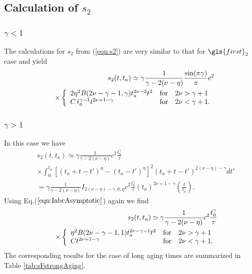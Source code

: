 \subsection{Calculation of $s_2$}

\subsubsection{$\gamma<1$}
The calculations for $s_2$ from (\ref{eqn:s2}) are very similar to that for $\gls{first}_{2}$ case and yield
\begin{eqnarray}
&& s_{2}(t,t_a) \simeq \gamma\frac{ 1}{\gamma-2(\nu-\eta)} \frac{\sin(\pi \gamma)}{\pi} c^2 \\
&& \; \times \left\{ \begin{array}{l l l}
2 \eta^2 B(2\nu -\gamma -1,\gamma)  t_a^{2\nu-2} t^2 & \mathrm{for}& 2\nu> \gamma+1\\
C \, t_a^{\gamma-1}t^{2\nu + 1-\gamma} & \mathrm{for} & 2\nu < \gamma+1.
\end{array} \right. \nonumber
\end{eqnarray}

\subsubsection{$\gamma>1$}
In this case we have 
\begin{eqnarray}
&& s_{2}(t,t_a) \simeq \gamma \frac{1}{\gamma-2(\nu-\eta)}c^2 \frac{t_0^{\gamma}}{\tau} \nonumber\\
&& \times \int^{t_a}_{0} \left[ (t_a+t-t')^{\eta}-(t_a-t')^{\eta} \right]^2 (t_a+t-t')^{2(\nu-\eta)-\gamma} dt' \nonumber \\
&&  =\gamma \frac{1}{\gamma-2(\nu-\eta)}I_{2(\nu-\eta)-\gamma,0,\eta} c^2 \frac{t_0^{\gamma}}{\tau} (t_a)^{2\nu+1- \gamma} \left(\frac{t}{t_a}\right) .
\end{eqnarray}
Using Eq.($\ref{eqn:IabcAsymptotic}$) again we find
\begin{eqnarray}
&& s_{2}(t,t_a) \simeq \gamma \frac{1}{\gamma-2(\nu-\eta)} c^2 \frac{t_0^{\gamma}}{\tau} \\
&& \;\;\; \times  \left\{ \begin{array}{l l l}
\eta^2  B(2\nu -\gamma -1,1)t_a^{2\nu -\gamma -1} t^2  &\mathrm{for} & 2\nu > \gamma +1 \\
C t^{2\nu +1-\gamma } & \mathrm{for} & 2\nu < \gamma + 1.
\end{array} \right. \nonumber
\end{eqnarray}
The corresponding results for the case of long aging times are summarized in Table \ref{tab:sFstrongAging}.


